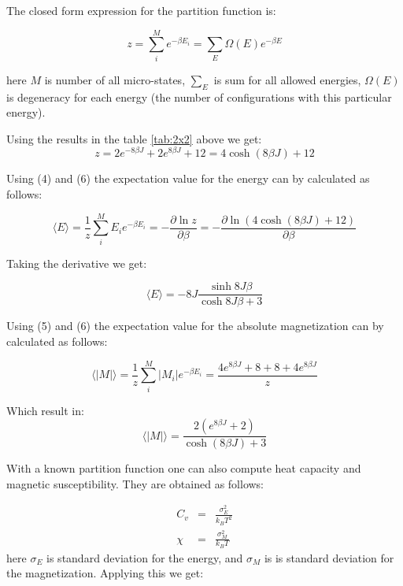 \documentclass[a4paper]{article}
\begin{document}
 The closed form expression for the partition function is:

\begin{equation}
z=\sum_{i}^{M}e^{-\beta E_{i}}=\sum_{E}\Omega (E)e^{-\beta E}
\end{equation}

here $M$ is number of all micro-states,  $\sum_{E}$ is sum for all allowed energies, $\Omega (E)$ is degeneracy
for each energy (the number of configurations with this particular energy). 

Using the results in the table \ref{tab:2x2} above we get:
\begin{equation}
z=2e^{-8\beta J}+2e^{8\beta J}+12=4\cosh (8\beta J)+12
\end{equation}

Using (4) and (6) the expectation value for the energy can by calculated as follows:

\begin{equation*}
\langle E\rangle =\frac{1}{z}\sum_{i}^{M}E_{i}e^{-\beta E_{i}}=-\frac{
\partial \ln z}{\partial \beta }=-\frac{\partial \ln (4\cosh (8\beta J)+12)}{
\partial \beta}
\end{equation*}

Taking the derivative we get:

\begin{equation}
\langle E\rangle =-8J\frac{\sinh 8J\beta }{\cosh 8J\beta+3}
\end{equation}

Using (5) and (6) the expectation value for the absolute magnetization can by calculated as follows:

\begin{equation*}
\langle \left\vert M\right\vert \rangle =\frac{1}{z}\sum_{i}^{M}\left\vert
M_{i}\right\vert e^{-\beta E_{i}}=\frac{4e^{8\beta J}+8+8+4e^{8\beta J}}{z}
\end{equation*}

Which result in:
\begin{equation}
\langle \left\vert M\right\vert \rangle = \frac{2(e^{8\beta J}+2)}{\cosh (8\beta J)+3}
\end{equation}

With a known partition function one can also compute heat capacity and magnetic susceptibility. They are obtained as follows:

\begin{eqnarray}
C_{v} &=&\frac{\sigma^2 _{E}}{k_{B}T^{2}} \\
\chi &=&\frac{\sigma^2 _{M}}{k_{B}T}
\end{eqnarray}
here $\sigma _{E}$ is standard deviation for the energy, and $\sigma _{M}$ is is standard deviation for the magnetization.
Applying this we get:
\end{document}
